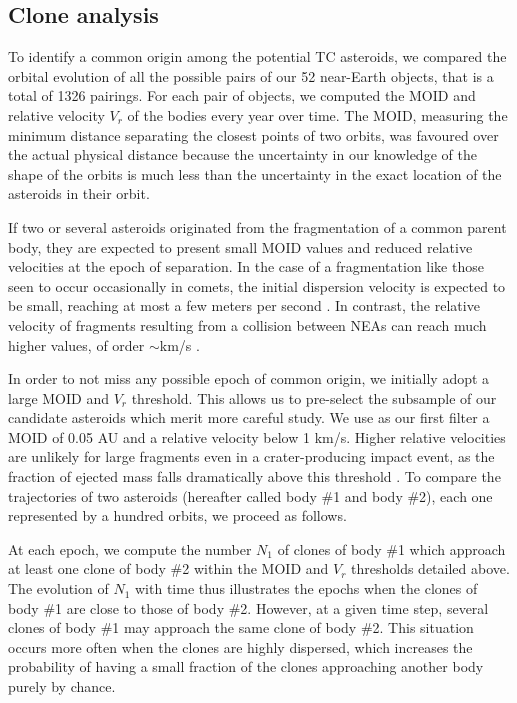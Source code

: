 \documentclass[letters,a4paper,fleqn,usenatbib]{mnras}
\begin{document}
\subsection{Clone analysis}\label{sec:method}

To identify a common origin among the potential TC asteroids, we compared the orbital evolution of all the possible pairs of our 52 near-Earth objects, that is a total of 1326 pairings. For each pair of objects, we computed the MOID and relative velocity $V_r$ of the bodies every year  over time. The MOID, measuring the minimum distance separating the closest points of two orbits, was favoured over the actual physical distance because the uncertainty in our knowledge of the shape of the orbits is much less than the uncertainty in the exact location of the asteroids in their orbit. 

If two or several asteroids originated from the fragmentation of a common parent body, they are expected to present small MOID values and reduced relative velocities at the epoch of separation. In the case of a fragmentation like those seen to occur occasionally in comets, the initial dispersion velocity is expected to be small, reaching at most a few meters per second \citep{Boehnhardt2004}. In contrast, the relative velocity of fragments resulting from a collision between NEAs can reach much higher values, of order $\sim$km/s \citep{Hyodo2020}. 

In order to not miss any possible epoch of common origin, we initially adopt a large MOID and $V_r$ threshold. This allows us to pre-select the subsample of our candidate asteroids which merit more careful study. We use as our first filter a MOID of 0.05 AU and a relative velocity below 1 km/s. Higher relative velocities are unlikely for large fragments even in a crater-producing impact event, as the fraction of ejected mass falls dramatically above this threshold \citep{Hyodo2020}.
To compare the trajectories of two asteroids (hereafter called body \#1 and body \#2), each one represented by a hundred orbits, we proceed as follows. 

At each epoch, we compute the number $N_1$ of clones of body \#1 which approach at least one clone of body \#2 within the MOID and $V_r$ thresholds detailed above. The evolution of $N_1$ with time thus illustrates the epochs when the clones of body \#1 are close to those of body \#2. However, at a given time step, several clones of body \#1 may approach the same clone of body \#2. This situation occurs more often when the clones are highly dispersed, which increases the probability of having a small fraction of the clones approaching another body purely by chance. 
\end{document}
